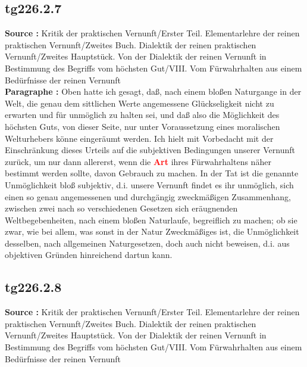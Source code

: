 \documentclass[a4paper,12pt,twoside]{book}
\newcommand{\match}[1]{\textcolor{red}{\textbf{#1}}}
\begin{document}
	\subsection*{tg226.2.7} 
	\textbf{Source : }Kritik der praktischen Vernunft/Erster Teil. Elementarlehre der reinen praktischen Vernunft/Zweites Buch. Dialektik der reinen praktischen Vernunft/Zweites Hauptstück. Von der Dialektik der reinen Vernunft in Bestimmung des Begriffs vom höchsten Gut/VIII. Vom Fürwahrhalten aus einem Bedürfnisse der reinen Vernunft\\  
	
	\noindent\textbf{Paragraphe : }Oben hatte ich gesagt, daß, nach einem bloßen Naturgange in der Welt, die genau dem sittlichen Werte angemessene Glückseligkeit nicht zu erwarten und für unmöglich zu halten sei, und daß also die Möglichkeit des höchsten Guts, von dieser Seite, nur unter Voraussetzung eines moralischen Welturhebers könne eingeräumt werden. Ich hielt mit Vorbedacht mit der Einschränkung dieses Urteils auf die subjektiven Bedingungen unserer Vernunft zurück, um nur dann allererst, wenn die \match{Art} ihres Fürwahrhaltens näher bestimmt werden sollte, davon Gebrauch zu machen. In der Tat ist die genannte Unmöglichkeit bloß subjektiv, d.i. unsere Vernunft findet es ihr unmöglich, sich einen so genau angemessenen und durchgängig zweckmäßigen Zusammenhang, zwischen zwei nach so verschiedenen Gesetzen  sich eräugnenden Weltbegebenheiten, nach einem bloßen Naturlaufe, begreiflich zu machen; ob sie zwar, wie bei allem, was sonst in der Natur Zweckmäßiges ist, die Unmöglichkeit desselben, nach allgemeinen Naturgesetzen, doch auch nicht beweisen, d.i. aus objektiven Gründen hinreichend dartun kann. 
	
	\subsection*{tg226.2.8} 
	\textbf{Source : }Kritik der praktischen Vernunft/Erster Teil. Elementarlehre der reinen praktischen Vernunft/Zweites Buch. Dialektik der reinen praktischen Vernunft/Zweites Hauptstück. Von der Dialektik der reinen Vernunft in Bestimmung des Begriffs vom höchsten Gut/VIII. Vom Fürwahrhalten aus einem Bedürfnisse der reinen Vernunft\\  
	
\end{document}
